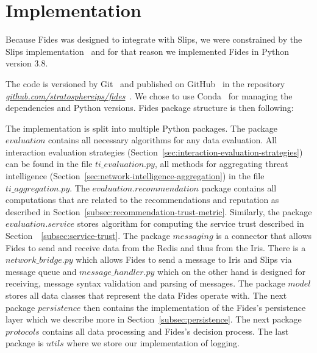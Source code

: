 \section{Implementation}
\label{sec:implementation}
Because Fides was designed to integrate with Slips, we were constrained by the Slips implementation~\cite{slips} and for that reason we implemented Fides in Python~\cite{python} version 3.8.

The code is versioned by Git~\cite{git} and published on GitHub~\cite{github} in the repository \textit{\href{https://github.com/stratosphereips/fides}{github.com/stratosphereips/fides}}~\cite{fidesGithub}.
We chose to use Conda~\cite{conda} for managing the dependencies and Python versions.
Fides package structure is then following:

\vspace{5mm}
\vspace{5mm}

The implementation is split into multiple Python packages. The package $evaluation$ contains all necessary algorithms for any data evaluation. All interaction evaluation strategies (Section~\ref{sec:interaction-evaluation-strategies}) can be found in the file $ti\_evaluation.py$, all methods for aggregating threat intelligence  (Section~\ref{sec:network-intelligence-aggregation}) in the file $ti\_aggregation.py$.
The $evaluation.recommendation$ package contains all computations that are related to the recommendations and reputation as described in Section~\ref{subsec:recommendation-trust-metric}.
Similarly, the package $evaluation.service$ stores algorithm for computing the service trust described in Section~~\ref{subsec:service-trust}.
The package $messaging$ is a connector that allows Fides to send and receive data from the Redis and thus from the Iris.
There is a $network\_bridge.py$ which allows Fides to send a message to Iris and Slips via message queue and $message\_handler.py$ which on the other hand is designed for receiving, message syntax validation and parsing of messages.
The package $model$ stores all data classes that represent the data Fides operate with. 
The next package $persistence$ then contains the implementation of the Fides's persistence layer which we describe more in Section~\ref{subsec:persistence}.
The next package $protocols$ contains all data processing and Fides's decision process. 
The last package is $utils$ where we store our implementation of logging.

